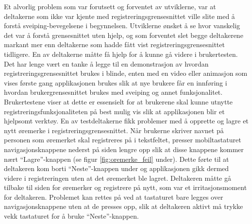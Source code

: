 \newline
Et alvorlig problem som var forutsett og forventet av utviklerne, var at deltakerne som ikke var kjente med registreringsgrensesnittet ville slite med å forstå sveiping-bevegelsene i begynnelsen. Utviklerne ønsket å se hvor vanskelig det var å forstå grensesnittet uten hjelp, og som forventet slet begge deltakerene markant mer enn deltakerne som hadde fått vist registreringsgrensesnittet tidligere. En av deltakerne måtte få hjelp for å kunne gå videre i brukertesten. Det har lenge vært en tanke å legge til en demonstrasjon av hvordan registreringsgrensesnittet brukes i blinde, enten med en video eller animasjon som vises første gang applikasjonen brukes slik at nye brukere får en innføring i hvordan brukergrensesnittet brukes med sveiping og annet funksjonalitet. Brukertestene viser at dette er essensielt for at brukerene skal kunne utnytte registreringsfunksjonaliteten på best mulig vis slik at applikasjonen blir et hjelpsomt verktøy. 
\newline
\newline
En av testdeltakerne fikk problemer med å opprette og lagre et nytt øremerke i registreringsgrensesnittet. Når brukerne skriver navnet på personen som øremerket skal registreres på i tekstfeltet, presser mobiltastaturet navigasjonsknappene nederst på siden lengre opp slik at disse knappene kommer nært \enquote{Lagre}-knappen (se figur \ref{fig:oremerke_feil} under). Dette førte til at deltakeren kom borti \enquote{Neste}-knappen under og applikasjonen gikk dermed videre i registreringen uten at det øremerket ble lagret. Deltakeren måtte gå tilbake til siden for øremerker og registrere på nytt, som var et irritasjonsmoment for deltakeren. Problemet kan rettes på ved at tastaturet bare legges over navigasjonsknappene uten at de presses opp, slik at deltakeren aktivt må trykke vekk tastaturet for å bruke \enquote{Neste}-knappen.  
